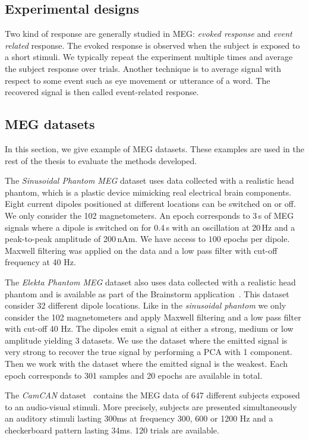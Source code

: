 \subsection{Experimental designs}
Two kind of response are generally studied in MEG: \emph{evoked response} and
\emph{event related} response.
The evoked response is observed when the subject is exposed to a short stimuli.
We typically repeat the experiment multiple times and average the subject
response over trials.
Another technique is to average signal with respect to some event such as eye
movement or utterance of a word. The recovered signal is then called
event-related response.

\subsection{MEG datasets}
\label{sec:meg:datasets}
In this section, we give example of MEG datasets. These examples are used in
the rest of the thesis to evaluate the methods developed.

The \emph{Sinusoidal Phantom MEG} dataset uses data collected with a realistic head phantom, which is a plastic device mimicking real electrical brain components.
% 
Eight current dipoles positioned at different locations can be switched on or off.
% 
We only consider the 102 magnetometers.
% 
An epoch corresponds to 3\,s of MEG signals where a dipole is switched on for 0.4\,s with an oscillation at 20\,Hz and a peak-to-peak amplitude of 200\,nAm.
% 
We have access to $100$ epochs per dipole.
%
Maxwell filtering was applied on the data and a low pass filter with cut-off
frequency at 40 Hz.

The \emph{Elekta Phantom MEG} dataset also uses data collected with a realistic
head phantom and is available as part of the Brainstorm
application~\cite{tadel2011brainstorm}.
This dataset consider 32 different dipole locations. Like in the
\emph{sinusoidal phantom} we only
consider the 102 magnetometers and apply Maxwell filtering and a low pass filter
with cut-off 40 Hz. The dipoles emit a signal at either a strong, medium or low
amplitude yielding 3 datasets.
We use the dataset where the emitted signal is very strong to recover the true signal
by performing a PCA with 1 component.
Then we work with the dataset where the emitted signal is the weakest.
Each epoch corresponds to 301 samples and 20 epochs are available in total.

The \emph{CamCAN} dataset~\cite{shafto2014cambridge}
contains the MEG data of 647 different
subjects exposed to an audio-visual stimuli. More precisely, subjects are presented simultaneously an
auditory stimuli lasting 300ms at frequency 300, 600 or 1200 Hz  and a
checkerboard pattern lasting 34ms. 120 trials are available.

